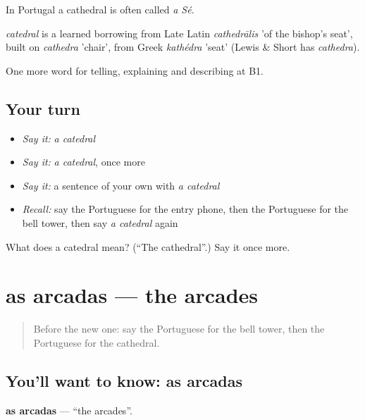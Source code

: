 In Portugal a cathedral is often called \emph{a Sé}.

\begin{cousinweb}
\emph{catedral} is a learned borrowing from Late Latin \emph{cathedrālis} 'of the bishop's seat', built on \emph{cathedra} 'chair', from Greek \emph{kathédra} 'seat' (Lewis \& Short has \emph{cathedra}).
\end{cousinweb}

\begin{grammarlens}[title={What you've built}]
One more word for telling, explaining and describing at B1.
\end{grammarlens}

\subsection*{Your turn}
\begin{itemize}
\raggedright
  \item \emph{Say it:} \emph{a catedral}
  \item \emph{Say it:} \emph{a catedral}, once more
  \item \emph{Say it:} a sentence of your own with \emph{a catedral}
  \item \emph{Recall:} say the Portuguese for the entry phone, then the Portuguese for the bell tower, then say \emph{a catedral} again
\end{itemize}

\begin{tcolorbox}[breakable,colback=teal!4,colframe=teal!35!black,title={Before you move on}]
What does a catedral mean? (\textquotedblleft{}The cathedral\textquotedblright{}.) Say it once more.
\end{tcolorbox}
\section[as arcadas]{as arcadas — the arcades}

\label{lesson:PT-C441-arcadas}



\begin{quote}
Before the new one: say the Portuguese for the bell tower, then the Portuguese for the cathedral.
\end{quote}

\subsection*{You'll want to know: as arcadas}
\textbf{as arcadas} — \textquotedblleft{}the arcades\textquotedblright{}.

